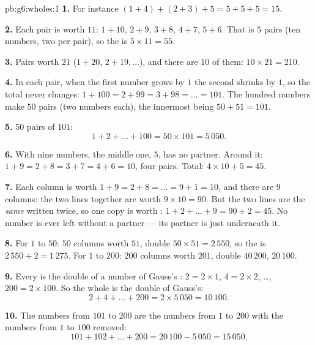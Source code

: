\begin{solution}{pb:g6:wholes:1}
\textbf{1.} For instance $(1 + 4) + (2 + 3) + 5 = 5 + 5 + 5 =
15$.

\textbf{2.} Each pair is worth $11$: $1 + 10$, $2 + 9$, $3 + 8$,
$4 + 7$, $5 + 6$. That is $5$ pairs (ten numbers, two per pair),
so the  is $5 \times 11 = 55$.

\textbf{3.} Pairs worth $21$ ($1 + 20$, $2 + 19, \dots$), and
there are $10$ of them: $10 \times 21 = 210$.

\textbf{4.} In each pair, when the first number grows by $1$ the
second shrinks by $1$, so the total never changes:
$1 + 100 = 2 + 99 = 3 + 98 = \dots = 101$. The hundred numbers
make $50$ pairs (two numbers each), the innermost being
$50 + 51 = 101$.

\textbf{5.} $50$ pairs of $101$:
\[
1 + 2 + \dots + 100 = 50 \times 101 = 5\,050 .
\]

\textbf{6.} With nine numbers, the middle one, $5$, has no
partner. Around it: $1 + 9 = 2 + 8 = 3 + 7 = 4 + 6 = 10$, four
pairs. Total: $4 \times 10 + 5 = 45$.

\textbf{7.} Each column is worth $1 + 9 = 2 + 8 = \dots =
9 + 1 = 10$, and there are $9$ columns: the two lines together
are worth $9 \times 10 = 90$. But the two lines are the
\emph{same}  written twice, so one copy is worth :
$1 + 2 + \dots + 9 = 90 \div 2 = 45$. No number is ever left
without a partner --- its partner is just underneath it.

\textbf{8.} For $1$ to $50$: $50$ columns worth $51$, double 
$50 \times 51 = 2\,550$, so the  is $2\,550 \div 2 = 1\,275$.
For $1$ to $200$: $200$ columns worth $201$, double 
$40\,200$,  $20\,100$.

\textbf{9.} Every  is the double of a number of
Gauss's : $2 = 2 \times 1$, $4 = 2 \times 2$, \dots,
$200 = 2 \times 100$. So the whole  is the double of Gauss's:
\[
2 + 4 + \dots + 200 = 2 \times 5\,050 = 10\,100 .
\]

\textbf{10.} The numbers from $101$ to $200$ are the numbers from
$1$ to $200$ with the numbers from $1$ to $100$ removed:
\[
101 + 102 + \dots + 200 = 20\,100 - 5\,050 = 15\,050 .
\]


\end{solution}
